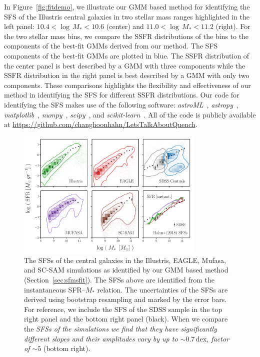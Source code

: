 \documentclass[tighten, preprint]{aastex62}
\begin{document}
In Figure~\ref{fig:fitdemo}, we illustrate our GMM based method for identifying the SFS of the Illustris central galaxies 
in two stellar mass ranges highlighted in the left panel: $10.4 < \log\,M_* < 10.6$ (center) 
and $11.0 < \log\,M_* < 11.2$ (right). For the two stellar mass bins, 
we compare the SSFR distributions of the bins to the components of the 
best-fit GMMs derived from our method. The SFS components of the best-fit 
GMMs are plotted in blue. The SSFR distribution of the center panel is best 
described by a GMM with three components while the SSFR distribution 
in the right  panel is best described by a GMM with only two components.
These comparisons highlights the flexibility and effectiveness of our 
method in identifying the SFS for different SSFR  distributions. 
Our code for identifying the SFS makes use of the following software: 
{\em astroML}~\citep{astroML}, {\em astropy}~\citep{astropy:2013,theastropycollaboration2018}, 
{\em matplotlib}~\citep{Hunter:2007}, {\em numpy}~\citep{numpy:2011}, 
{\em scipy}~\citep{scipy:2001}, and {\em scikit-learn}~\citep{scikit-learn:2011}. 
All of the code is publicly available at \url{https://github.com/changhoonhahn/LetsTalkAboutQuench}.

\begin{figure}
\begin{center}
\includegraphics[width = 0.8\textwidth]{Catalogs_SFMSfit_SFRinst.pdf} 
\caption{The SFSs of the central galaxies in the Illustris, EAGLE, {\sc Mufasa}, 
    and SC-SAM simulations as identified by our GMM based method (Section~\ref{sec:sfmsfit}).
    The SFSs above are identified from the instantaneous SFR--$M_*$ relation. 
    The uncertainties of the SFSs are derived using bootstrap resampling 
    and marked by the error bars. For reference, we include the SFS of the SDSS 
    sample in the top right panel and the bottom right panel (black). 
    When we compare the \emph{SFSs of the simulations we find that they have significantly different slopes and their amplitudes vary by up to ${\sim}0.7\,\mathrm{dex}$, 
    factor of ${\sim}5$} 
    (bottom right).} \label{fig:sfmsfit_inst}
\end{center}
\end{figure}
\end{document}
